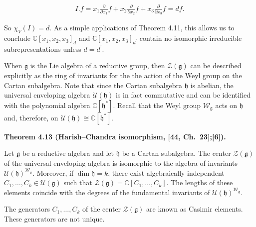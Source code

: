 \[\begin{aligned}
\displaystyle I.f=x_{1}\frac{\partial}{\partial x_{1}}f+x_{2}\frac{\partial}{\partial x_{2}}f+x_{3}\frac{\partial}{\partial x_{3}}f=df.
\end{aligned}\]


So $\chi_{V}(I)=d$.
As a simple applications of Theorem 4.11, this allows us to conclude $\mathbb{C}[x_{1},x_{2},x_{3}]_{d}$ and $\mathbb{C}[x_{1},x_{2},x_{3}]_{d^{\prime}}$ contain no isomorphic irreducible subrepresentations unless $d=d^{\prime}$.






When $\mathfrak{g}$ is the Lie algebra of a reductive group, then $\mathcal{Z}(\mathfrak{g})$ can be described explicitly as the ring of invariants for the the action of the Weyl group on the Cartan subalgebra.
Note that since the Cartan subalgebra $\mathfrak{h}$ is abelian, the universal enveloping algebra $\mathcal{U}(\mathfrak{h})$ is in fact commutative and can be identified with the polynomial algebra $\mathbb{C}[\mathfrak{h}^{*}]$.
Recall that the Weyl group $\mathcal{W}_{\mathfrak{g}}$ acts on $\mathfrak{h}$ and, therefore, on $\mathcal{U}(\mathfrak{h})\cong\mathbb{C}[\mathfrak{h}^{*}]$.





\par\medskip\noindent\textbf{Theorem 4.13 (Harish–Chandra isomorphism, [44, Ch. 23];[6]).}\par



Let $\mathfrak{g}$ be a reductive algebra and let $\mathfrak{h}$ be a Cartan subalgebra.
The center $\mathcal{Z}(\mathfrak{g})$ of the universal enveloping algebra is isomorphic to the algebra of invariants $\mathcal{U}(\mathfrak{h})^{\mathcal{W}_{\mathfrak{g}}}$. Moreover, if $\dim\mathfrak{h}=k$, there exist algebraically independent $C_{1},\dots,C_{k}\in\mathcal{U}(\mathfrak{g})$ such that $\mathcal{Z}(\mathfrak{g})=\mathbb{C}[C_{1},\dots,C_{k}]$. The lengths of these elements coincide with the degrees of the fundamental invariants of $\mathcal{U}(\mathfrak{h})^{\mathcal{W}_{\mathfrak{g}}}$.






The generators $C_{1},\dots,C_{k}$ of the center $\mathcal{Z}(\mathfrak{g})$ are known as Casimir elements.
These generators are not unique.





